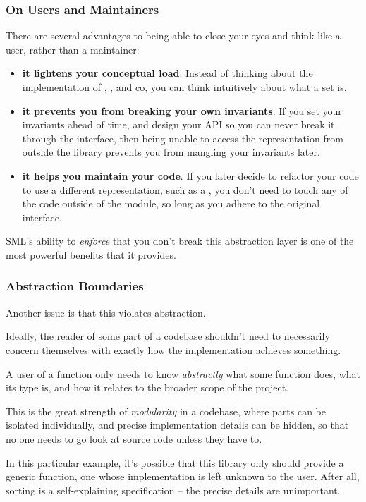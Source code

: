 \documentclass[aspectratio=169]{beamer}
\begin{document}
\begin{frame}[fragile]
  \frametitle{On Users and Maintainers}

  There are several advantages to being able to close your eyes and think like a 
  user, rather than a maintainer:

  \begin{itemize}
    \item \textbf{it lightens your conceptual load}. Instead of thinking about the implementation
    of , , and co, you can think intuitively about what
    a set is.
    \item \textbf{it prevents you from breaking your own invariants}. If you set your invariants
    ahead of time, and design your API so you can never break it through the interface,
    then being unable to access the representation from outside the library prevents
    you from mangling your invariants later.
    \item \textbf{it helps you maintain your code}. If you later decide to refactor your code
    to use a different representation, such as a , you don't need to 
    touch any of the code outside of the module, so long as you adhere to the
    original interface.
  \end{itemize}

  \vspace{\fill}

  SML's ability to \textit{enforce} that you don't break this abstraction layer
  is one of the most powerful benefits that it provides. 
\end{frame}



\begin{frame}[fragile]
  \frametitle{Abstraction Boundaries}

  Another issue is that this violates abstraction.

  Ideally, the reader of some part of a codebase shouldn't need to necessarily
  concern themselves with exactly how the implementation achieves something.
  
  A user of a function only needs to know \textit{abstractly} what some function
  does, what its type is, and how it relates to the broader scope of the project.

  This is the great strength of \textit{modularity} in a codebase, where parts
  can be isolated individually, and precise implementation details can be hidden,
  so that no one needs to go look at source code unless they have to.

  In this particular example, it's possible that this library only should provide
  a generic  function, one whose implementation is left unknown to the
  user. After all, sorting is a self-explaining specification -- the precise details
  are unimportant.
\end{frame}
\end{document}
